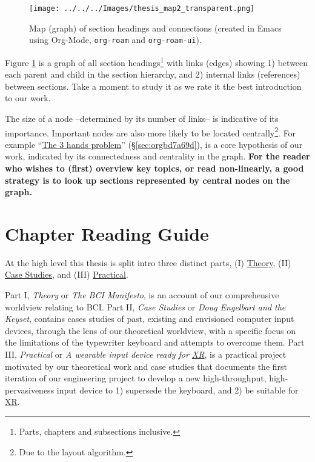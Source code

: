 \documentclass[logo,bsc,singlespacing,parskip]{infthesis}
\begin{document}
\begin{figure}[H]
\centering
\texttt{[image: ../../../Images/thesis\_map2\_transparent.png]}
\caption[Thesis map]{\label{fig:topic_map}Map (graph) of section headings and connections (created in Emacs using Org-Mode, \texttt{org-roam} and \texttt{org-roam-ui}).}
\end{figure}

Figure \ref{fig:topic_map} is a graph of all section headings\footnote{Parts, chapters and subsections inclusive.} with links (edges) showing 1) between each parent and child in the section hierarchy, and 2) internal links (references) between sections.
Take a moment to study it as we rate it the best introduction to our work.

The size of a node --determined by its number of links-- is indicative of its importance.
Important nodes are also more likely to be located centrally\footnote{Due to the layout algorithm.}.
For example ``\hyperref[sec:orgbd7a69d]{The 3 hands problem}'' (\S \ref{sec:orgbd7a69d}), is a core hypothesis of our work, indicated by its connectedness and centrality in the graph.
\textbf{For the reader who wishes to (first) overview key topics, or read non-linearly, a good strategy is to look up sections represented by central nodes on the graph.}

\chapter*{Chapter Reading Guide}
\label{sec:org13240ac}
At the high level this thesis is split intro three distinct parts, (I) \hyperref[sec:org381599c]{Theory}, (II) \hyperref[sec:org996b0f9]{Case Studies}, and (III) \hyperref[sec:orgee89f2f]{Practical}.

Part I, \emph{Theory} or \emph{The BCI Manifesto}, is an account of our comprehensive worldview relating to BCI.
Part II, \emph{Case Studies} or \emph{Doug Engelbart and the Keyset}, contains cases studies of past, existing and envisioned computer input devices, through the lens of our theoretical worldview, with a specific focus on the limitations of the typewriter keyboard and attempts to overcome them.
Part III, \emph{Practical} or \emph{A wearable input device ready for \hyperref[orgf7f8e78]{XR}}, is a practical project motivated by our theoretical work and case studies that documents the first iteration of our engineering project to develop a new high-throughput, high-pervasiveness input device to 1) supersede the keyboard, and 2) be suitable for \hyperref[orgf7f8e78]{XR}.
\end{document}

